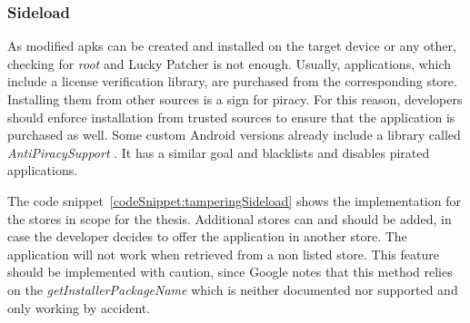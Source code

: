 \newpage
\subsubsection{Sideload} \label{subsection:counter-improve-tampering-sideload}
As modified \gls{apk}s can be created and installed on the target device or any other, checking for \textit{root} and Lucky Patcher is not enough.
Usually, applications, which include a license verification library, are purchased from the corresponding store.
Installing them from other sources is a sign for piracy.
For this reason, developers should enforce installation from trusted sources to ensure that the application is purchased as well.
Some custom Android versions already include a library called \textit{AntiPiracySupport} \cite{antipiracy}.
It has a similar goal and blacklists and disables pirated applications.
\newline

The code snippet~\ref{codeSnippet:tamperingSideload} shows the implementation for the stores in scope for the thesis.
Additional stores can and should be added, in case the developer decides to offer the application in another store.
The application will not work when retrieved from a non listed store.
\newline
\newline
This feature should be implemented with caution, since Google notes that this method relies on the \textit{getInstallerPackageName} which is neither documented nor supported and \grqq only working by accident\grqq \cite{developersSecuring}.
